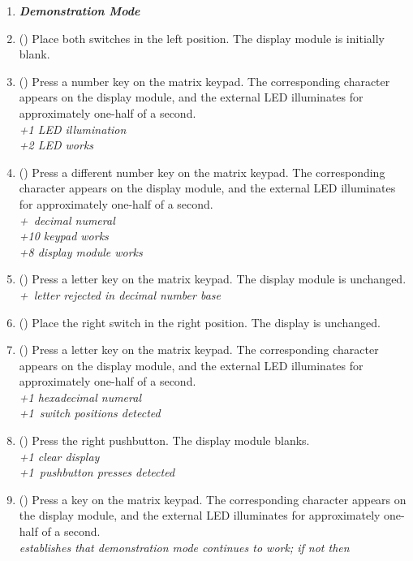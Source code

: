\begin{enumerate}
\item [] \textbf{\textit{Demonstration Mode}}
\item (\phantom{xxx}) Place both switches in the left position. The display
    module is initially blank.
\item(\phantom{xxx}) Press a number key on the matrix keypad. The corresponding
    character appears on the display module, and the external LED illuminates
    for approximately one-half of a second. \\
    \textit{+1 LED illumination} \\
    \textit{+2 LED works}
\item (\phantom{xxx}) Press a different number key on the matrix keypad.
    The corresponding character appears on the display module, and the external
    LED illuminates for approximately one-half of a second. \\
    \textit{+\textonehalf\ decimal numeral} \\
    \textit{+10 keypad works} \\
    \textit{+8 display module works}
\item (\phantom{xxx}) Press a letter key on the matrix keypad. The display
    module is unchanged. \\
    \textit{+\textonehalf\ letter rejected in decimal number base}
\item (\phantom{xxx}) Place the right switch in the right position. The display
    is unchanged.
\item (\phantom{xxx}) Press a letter key on the matrix keypad. The
    corresponding character appears on the display module, and the external LED
    illuminates for approximately one-half of a second. \\
    \textit{+1 hexadecimal numeral} \\
    \textit{+1\textonehalf\ switch positions detected}
\item (\phantom{xxx}) Press the right pushbutton. The display module blanks. \\
    \textit{+1 clear display} \\
    \textit{+1\textonehalf\ pushbutton presses detected}
\item (\phantom{xxx}) Press a key on the matrix keypad. The corresponding
    character appears on the display module, and the external LED illuminates
    for approximately one-half of a second. \\
    \textit{establishes that demonstration mode continues to work; if not then
}
\end{enumerate}
